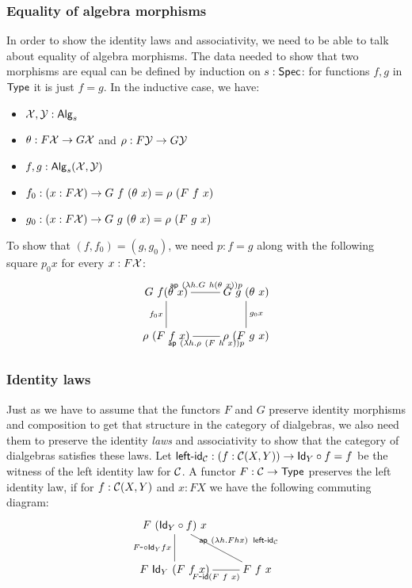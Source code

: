 \documentclass[a4paper,10pt]{article}
\begin{document}
\subsubsection{Equality of algebra morphisms}

In order to show the identity laws and associativity, we need to be
able to talk about equality of algebra morphisms. The data needed to
show that two morphisms are equal can be defined by induction on
$s : \mathsf{Spec}$: for functions $f, g$ in $\mathsf{Type}$ it is just $f = g$. In
the inductive case, we have:
%
\begin{itemize}
\item $\mathcal{X}, \mathcal{Y} : \mathsf{Alg}_s$
\item $\theta : F \mathcal{X} \to G \mathcal{X}$ and $\rho : F \mathcal{Y} \to G \mathcal{Y}$
\item $f, g : \mathsf{Alg}_s(\mathcal{X},\mathcal{Y})$
\item $f_0 : (x : F \alg{X}) \to G\ f\ (\theta\ x) = \rho\ (F\ f\ x)$
\item $g_0 : (x : F \alg{X}) \to G\ g\ (\theta\ x) = \rho\ (F\ g\ x)$
\end{itemize}
%
To show that $(f,f_0) = (g,g_0)$, we need $p : f = g$ along with the
following square $p_0 x$ for every $x : F \mathcal{X}$:
$$
\xymatrix{
G\ f (\theta\ x) \ar@{-}[d]_{f_0 x} \ar@{-}[r]^{\ap\ (\lambda h . G\ h (\theta\ x)) p}  &G\ g\ (\theta\ x) \ar@{-}[d]^{g_0 x} \\
\rho\ (F\ f\ x) \ar@{-}[r]_{\ap\ (\lambda h . \rho\ (F\ h\ x)) p} &\rho\ (F\ g\ x) }
$$
\subsubsection{Identity laws}

Just as we have to assume that the functors $F$ and $G$ preserve
identity morphisms and composition to get that structure in the
category of dialgebras, we also need them to preserve the identity
\emph{laws} and associativity to show that the category of dialgebras
satisfies these laws. Let
$\operatorname{\mathsf{left-id}}_{\mathcal{C}} : (f : \mathcal{C}(X,Y)) \to \mathsf{Id}_{Y} \circ f = f$ be the witness
of the left identity law for $\mathcal{C}$. A functor $F : \mathcal{C} \to \mathsf{Type}$
preserves the left identity law, if for $f : \mathcal{C} (X,Y)$ and $x : FX$ we
have the following commuting diagram:
$$
\xymatrix{
F\ (\Id{Y} \circ f)\ x \ar@{-}[d]_{\Fcomp \Id{Y} f x} \ar@{-}[dr]^{\ap\ (\lambda h . F h x)\ \leftid_{\C}}\\
F\ \Id{Y}\ (F\ f\ x) \ar@{-}[r]_{\Fid (F\ f\ x)} &F\ f\ x
}
$$
\end{document}
